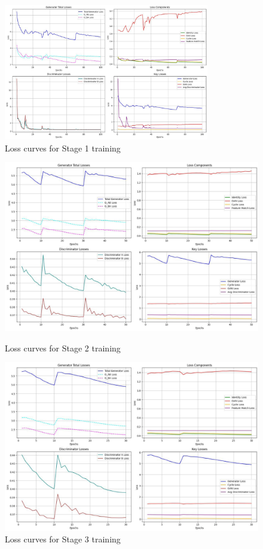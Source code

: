 \documentclass[twoside,english,notitlepage]{report}
\begin{document}
\begin{figure}[h]
    \centering
    \includegraphics[width=0.8\textwidth]{task1/stage1_loss.jpg}
    \vspace{-10pt}
    \caption{Loss curves for Stage 1 training}
\end{figure}
\begin{figure}[h]
    \centering
    \includegraphics[width=0.8\linewidth]{task1/stage2_loss.jpg}
    \vspace{-10pt}
    \caption{Loss curves for Stage 2 training}
    \vspace{12pt}
    \includegraphics[width=0.8\linewidth]{task1/stage3_loss.jpg}
    \vspace{-10pt}
    \caption{Loss curves for Stage 3 training}
\end{figure}
\end{document}
